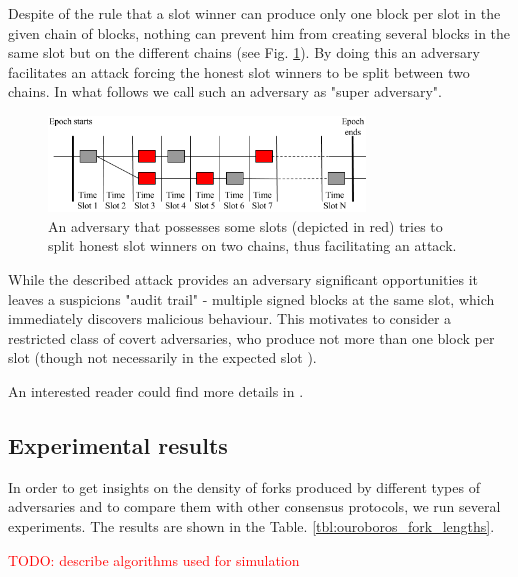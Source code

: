 \documentclass[10pt,a4paper]{article}
\newcommand\myworries[1]{\textcolor{red}{#1}}
\numberwithin{equation}{section} %
\theoremstyle{plain}
\theoremstyle{definition}
\theoremstyle{remark}
\begin{document}
    Despite of the rule that a slot winner can produce only one block per slot in the given chain of blocks, nothing can prevent him from creating several blocks in the same slot but on the different chains (see Fig. \ref{fig:ouroboros_split_attack}). By doing this an adversary facilitates an attack forcing the honest slot winners to be split between two chains. In what follows we call such an adversary as "super adversary".
    \begin{figure}[h] 
        \centering
        \includegraphics[width=0.75\textwidth]{ouroboros_split_attack}
        \caption{An adversary that possesses some slots (depicted in red) tries to split honest slot winners on two chains, thus facilitating an attack.}
        \label{fig:ouroboros_split_attack}
    \end{figure}
    
    While the described attack provides an adversary significant opportunities it leaves a suspicions "audit trail" - multiple signed blocks at the same slot, which immediately discovers malicious behaviour. This motivates to consider a restricted class of covert adversaries, who produce not more than one block per slot (though not necessarily in the expected slot \cite{KRDO16}).
    
    An interested reader could find more details in \cite{KRDO16, RMKQ17}.
    
    \subsection{Experimental results}
    
    In order to get insights on the density of forks produced by different types of adversaries and to compare them with other consensus protocols, we run several experiments. The results are shown in the Table. \ref{tbl:ouroboros_fork_lengths}.
    
    \myworries{TODO: describe algorithms used for simulation}
    
\end{document}
